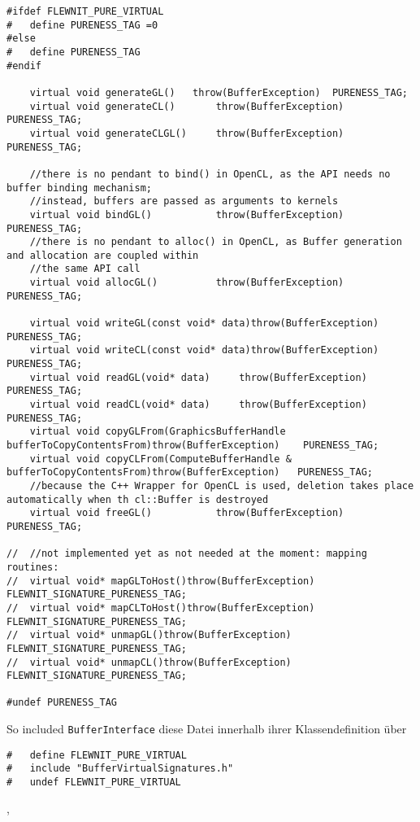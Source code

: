 	\begin{lstlisting}[caption={API- und Buffertyp-abhängige Operationen auf Buffern -- Definitionen},
					   label=listing:bufferOpDefs]	
#ifdef FLEWNIT_PURE_VIRTUAL
#	define PURENESS_TAG =0
#else
#	define PURENESS_TAG
#endif

	virtual void generateGL()	throw(BufferException)	PURENESS_TAG;
	virtual void generateCL()		throw(BufferException)	PURENESS_TAG;
	virtual void generateCLGL()		throw(BufferException)	PURENESS_TAG;

	//there is no pendant to bind() in OpenCL, as the API needs no buffer binding mechanism;
	//instead, buffers are passed as arguments to kernels
	virtual void bindGL()			throw(BufferException)	PURENESS_TAG;
	//there is no pendant to alloc() in OpenCL, as Buffer generation and allocation are coupled within
	//the same API call
	virtual void allocGL()			throw(BufferException)	PURENESS_TAG;

	virtual void writeGL(const void* data)throw(BufferException)	PURENESS_TAG;
	virtual void writeCL(const void* data)throw(BufferException)	PURENESS_TAG;
	virtual void readGL(void* data)		throw(BufferException)	PURENESS_TAG;
	virtual void readCL(void* data)		throw(BufferException)	PURENESS_TAG;
	virtual void copyGLFrom(GraphicsBufferHandle bufferToCopyContentsFrom)throw(BufferException)	PURENESS_TAG;
	virtual void copyCLFrom(ComputeBufferHandle & bufferToCopyContentsFrom)throw(BufferException)	PURENESS_TAG;
	//because the C++ Wrapper for OpenCL is used, deletion takes place automatically when th cl::Buffer is destroyed
	virtual void freeGL()			throw(BufferException)	PURENESS_TAG;
	
//	//not implemented yet as not needed at the moment: mapping routines:
//	virtual void* mapGLToHost()throw(BufferException)	FLEWNIT_SIGNATURE_PURENESS_TAG;
//	virtual void* mapCLToHost()throw(BufferException)	FLEWNIT_SIGNATURE_PURENESS_TAG;
//	virtual void* unmapGL()throw(BufferException)	FLEWNIT_SIGNATURE_PURENESS_TAG;
//	virtual void* unmapCL()throw(BufferException)	FLEWNIT_SIGNATURE_PURENESS_TAG;

#undef PURENESS_TAG
	\end{lstlisting}
	
	So included \lstinline|BufferInterface| diese Datei innerhalb ihrer Klassendefinition über
	\begin{lstlisting}
#	define FLEWNIT_PURE_VIRTUAL
#	include "BufferVirtualSignatures.h"
#	undef FLEWNIT_PURE_VIRTUAL
	\end{lstlisting},
	
